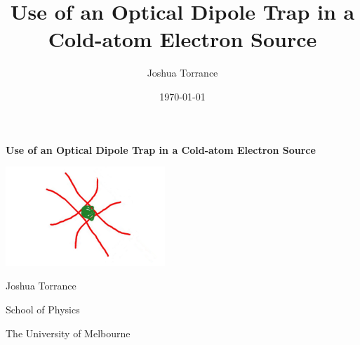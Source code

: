 \documentclass[12pt]{book}
\title{Use of an Optical Dipole Trap in a Cold-atom Electron Source}
\author{Joshua Torrance}
\date{\today}
\begin{document}


    \renewcommand{\footnotesize}{\small}
    \renewcommand{\footnoterule}{\relax}
    \thispagestyle{empty}
    \begin{center}
        { \Huge {\bfseries {Use of an Optical Dipole Trap in a Cold-atom Electron Source}} \par}
    {\large \vspace*{35mm} {{\includegraphics[width=6cm]{figs/crosseddipoletrap1.png}} \par} \vspace*{25mm}}
        {{\vspace*{30mm} \Large {Joshua Torrance}} \par} 
    {\large 
	    \vspace*{1ex}
        {{School of Physics} \par}
	    \vspace*{1ex}
        {{The University of Melbourne} \par}
	    \vspace*{25mm}
    }%
    \end{center}
    \null\vfill


\tableofcontents


\renewcommand{\chaptername}{} %



%




\printglossaries
\newpage

{}

\end{document}
